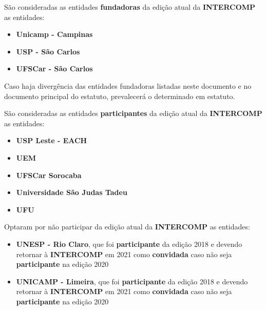 
\begin{article}
	\label{art:fundadoras}
	São consideradas as entidades \textbf{fundadoras} da edição atual da \textbf{INTERCOMP} as entidades:
	\begin{itemize}[noitemsep]
		\item \textbf{Unicamp - Campinas}
		\item \textbf{USP - São Carlos}
		\item \textbf{UFSCar - São Carlos}
	\end{itemize}

	\begin{xparagraph}
		Caso haja divergência das entidades fundadoras listadas neste documento e no documento principal do estatuto, prevalecerá o determinado em estatuto.
	\end{xparagraph}
\end{article}

\begin{article}
	\label{art:participantes}
	São consideradas as entidades \textbf{participantes} da edição atual da \textbf{INTERCOMP} as entidades:
	\begin{itemize}[noitemsep]
		\item \textbf{USP Leste - EACH}
		\item \textbf{UEM}
		\item \textbf{UFSCar Sorocaba}
		\item \textbf{Universidade São Judas Tadeu}
		\item \textbf{UFU}
	\end{itemize}
\end{article}

\begin{article}
	\label{art:naoparticipantes}
	Optaram por não participar da edição atual da \textbf{INTERCOMP} as entidades:
	\begin{itemize}[noitemsep]
		\item \textbf{UNESP - Rio Claro}, que foi \textbf{participante} da edição 2018 e devendo retornar à \textbf{INTERCOMP} em 2021 como \textbf{convidada} caso não seja \textbf{participante} na edição 2020
		\item \textbf{UNICAMP - Limeira}, que foi \textbf{participante} da edição 2018 e devendo retornar à \textbf{INTERCOMP} em 2021 como \textbf{convidada} caso não seja \textbf{participante} na edição 2020
		\end{itemize}
\end{article}


